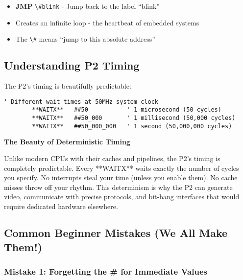 \documentclass[11pt]{book}
\providecommand{\tightlist}{%
  \setlength{\itemsep}{0pt}\setlength{\parskip}{0pt}}
\newcommand{\passthrough}[1]{#1}
\begin{document}
\begin{itemize}
\tightlist
\item
  \textbf{JMP} \passthrough{\lstinline!\#blink!} - Jump back to the
  label ``blink''
\item
  Creates an infinite loop - the heartbeat of embedded systems
\item
  The \passthrough{\lstinline!\#!} means ``jump to this absolute
  address''
\end{itemize}

\hypertarget{understanding-p2-timing}{%
\subsection{Understanding P2 Timing}\label{understanding-p2-timing}}

The P2's timing is beautifully predictable:

\begin{lstlisting}
' Different wait times at 50MHz system clock
        **WAITX**   ##50           ' 1 microsecond (50 cycles)
        **WAITX**   ##50_000       ' 1 millisecond (50,000 cycles)  
        **WAITX**   ##50_000_000   ' 1 second (50,000,000 cycles)
\end{lstlisting}

\begin{interlude}
\textbf{The Beauty of Deterministic Timing}

Unlike modern CPUs with their caches and pipelines, the P2's timing is completely predictable. Every **WAITX** waits exactly the number of cycles you specify. No interrupts steal your time (unless you enable them). No cache misses throw off your rhythm. This determinism is why the P2 can generate video, communicate with precise protocols, and bit-bang interfaces that would require dedicated hardware elsewhere.
\end{interlude}

\hypertarget{common-beginner-mistakes-we-all-make-them}{%
\subsection{Common Beginner Mistakes (We All Make
Them!)}\label{common-beginner-mistakes-we-all-make-them}}

\hypertarget{mistake-1-forgetting-the-for-immediate-values}{%
\subsubsection{Mistake 1: Forgetting the \# for Immediate
Values}\label{mistake-1-forgetting-the-for-immediate-values}}
\end{document}
